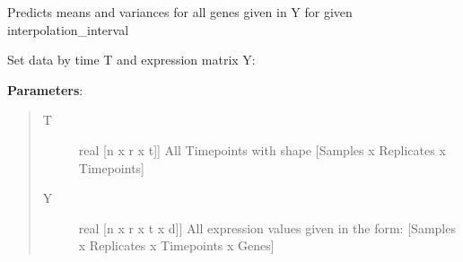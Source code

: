 \documentclass[letterpaper,10pt,english]{sphinxmanual}
\begin{document}
\begin{fulllineitems}
\begin{fulllineitems}
\end{fulllineitems}


\begin{fulllineitems}
\label{base:gptwosample.twosample.twosample.TwoSample.predict_means_variances}
Predicts means and variances for all genes given in Y for given interpolation\_interval

\end{fulllineitems}


\begin{fulllineitems}
\label{base:gptwosample.twosample.twosample.TwoSample.set_data}
Set data by time T and expression matrix Y:

\textbf{Parameters}:
\begin{quote}
\begin{description}
\item[{T}] \leavevmode{[}real {[}n x r x t{]}{]}
All Timepoints with shape {[}Samples x Replicates x Timepoints{]}

\item[{Y}] \leavevmode{[}real {[}n x r x t x d{]}{]}
All expression values given in the form: {[}Samples x Replicates x Timepoints x Genes{]}

\end{description}
\end{quote}

\end{fulllineitems}


\end{fulllineitems}

\end{document}
